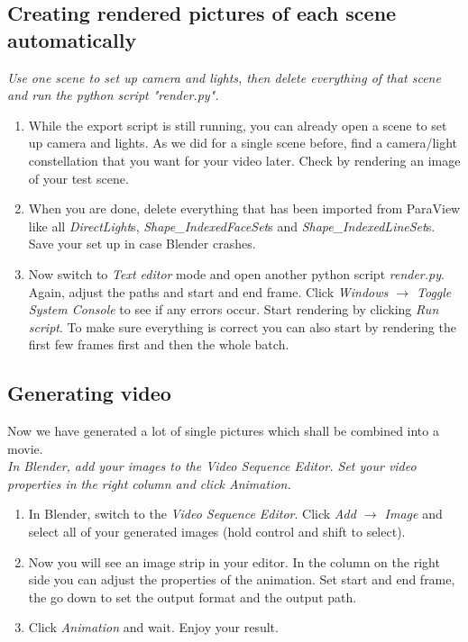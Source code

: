 \documentclass[11pt,twoside,a4paper]{fdyartcl}
\theoremstyle{myPlain}
\theoremstyle{myDefinition}
\begin{document}
\subsection{Creating rendered pictures of each scene automatically}
\textit{Use one scene to set up camera and lights, then delete everything of that scene and run the python script "render.py".}
\begin{enumerate}
	\item While the export script is still running, you can already open a scene to set up camera and lights. As we did for a single scene before, find a camera/light constellation that you want for your video later. Check by rendering an image of your test scene.
	\item When you are done, delete everything that has been imported from ParaView like all \textit{DirectLight}s, \textit{Shape\_IndexedFaceSet}s and \textit{Shape\_IndexedLineSet}s. Save your set up in case Blender crashes.
	\item Now switch to \textit{Text editor} mode and open another python script \textit{render.py}. Again, adjust the paths and start and end frame. Click \textit{Windows $\rightarrow$ Toggle System Console} to see if any errors occur. Start rendering by clicking \textit{Run script}. To make sure everything is correct you can also start by rendering the first few frames first and then the whole batch. 
\end{enumerate}
\subsection{Generating video}
Now we have generated a lot of single pictures which shall be combined into a movie.\\
\textit{In Blender, add your images to the Video Sequence Editor. Set your video properties in the right column and click Animation.}
\begin{enumerate}
	\item In Blender, switch to the \textit{Video Sequence Editor}. Click \textit{Add $\rightarrow$ Image} and select all of your generated images (hold control and shift to select).
	\item Now you will see an image strip in your editor. In the column on the right side you can adjust the properties of the animation. Set start and end frame, the go down to set the output format and the output path. 
	\item Click \textit{Animation} and wait. Enjoy your result.
\end{enumerate}
\end{document}
